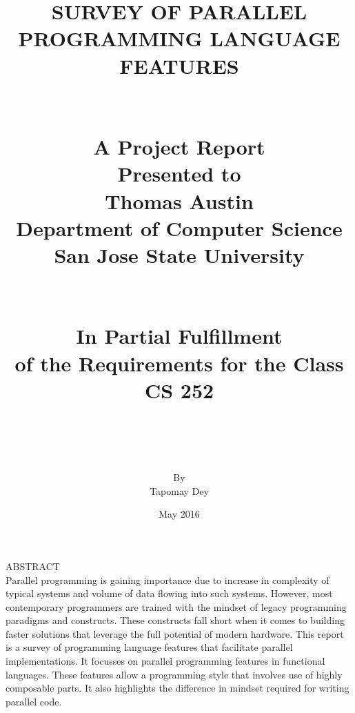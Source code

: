 \documentclass[12pt,a4paper]{article}
\begin{document}
	
	\title{
	    {SURVEY OF PARALLEL PROGRAMMING LANGUAGE FEATURES}\\~\\~\\
	    {\large A Project Report}\\
	    {\large Presented to}\\
	    {\large Thomas Austin}\\
	    {\large Department of Computer Science}\\
	    {\large San Jose State University}\\~\\~\\
	    {\large In Partial Fulfillment}\\
	    {\large of the Requirements for the Class}\\
	    {\large CS 252}\\~\\~\\
    }
    
    \author{By\\Tapomay Dey}
    \date{May 2016}
	\maketitle
	
	\thispagestyle{empty}
	
	\newpage
	\doublespacing
	\noindent
	\large ABSTRACT\\
	Parallel programming is gaining importance due to increase in complexity of typical systems and volume of data flowing into such systems. However, most contemporary programmers are trained with the mindset of legacy programming paradigms and constructs. These constructs fall short when it comes to building faster solutions that leverage the full potential of modern hardware. This report is a survey of programming language features that facilitate parallel implementations. It focusses on parallel programming features in functional languages. These features allow a programming style that involves use of highly composable parts. It also highlights the difference in mindset required for writing parallel code.
    
    \thispagestyle{empty}
	\newpage
	
	\tableofcontents
	\thispagestyle{empty}
	\newpage
	
	\clearpage
    \doublespacing
\end{document}
